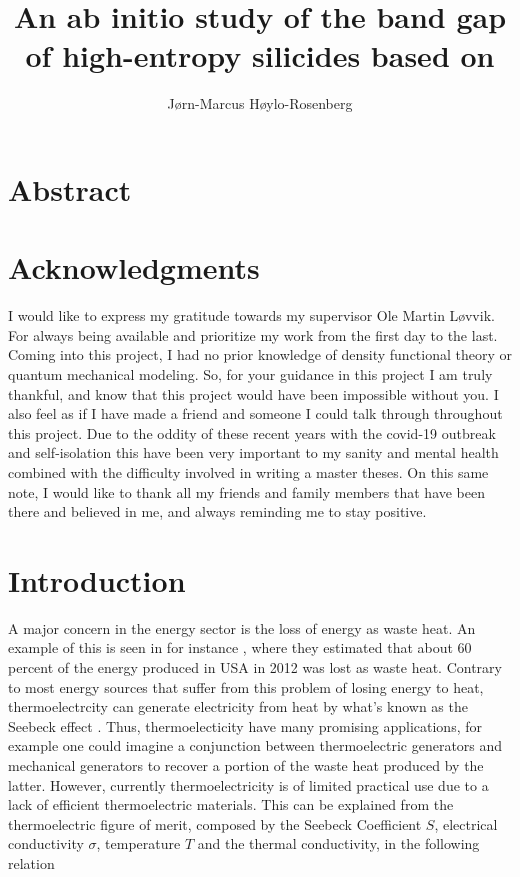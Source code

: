 \documentclass[UKenglish]{ifimaster}  %
\title{An ab initio study of the band gap of high-entropy silicides based on \ch{FeSi2}}        %
\author{Jørn-Marcus Høylo-Rosenberg}                      %
\begin{document}
\duoforside[dept={Department of Chemistry},   %
  program={Materials Science for Energy and Nanotechnology},  %
  long]                                        %

\frontmatter{}  

\chapter*{Abstract}                   %

\tableofcontents{}
\listoffigures{}
\listoftables{}

\chapter*{Acknowledgments}                    %

I would like to express my gratitude towards my supervisor Ole Martin Løvvik. For always being available and prioritize my work from the first day to the last. Coming into this project, I had no prior knowledge of density functional theory or quantum mechanical modeling. So, for your guidance in this project I am truly thankful, and know that this project would have been impossible without you. I also feel as if I have made a friend and someone I could talk through throughout this project. Due to the oddity of these recent years with the covid-19 outbreak and self-isolation this have been very important to my sanity and mental health combined with the difficulty involved in writing a master theses. On this same note, I would like to thank all my friends and family members that have been there and believed in me, and always reminding me to stay positive. 

\mainmatter{}

\chapter{Introduction}                  %

A major concern in the energy sector is the loss of energy as waste heat. An example of this is seen in for instance \cite{thermo}, where they estimated that about 60 percent of the energy produced in USA in 2012 was lost as waste heat. Contrary to most energy sources that suffer from this problem of losing energy to heat, thermoelectrcity can generate electricity from heat by what's known as the Seebeck effect \cite{wikipedia_thermoelectric_2020}. Thus, thermoelecticity have many promising applications, for example one could imagine a conjunction between thermoelectric generators and mechanical generators to recover a portion of the waste heat produced by the latter. However, currently thermoelectricity is of limited practical use due to a lack of efficient thermoelectric materials.  This can be explained from the thermoelectric figure of merit, composed by the Seebeck Coefficient $S$, electrical conductivity $\sigma$, temperature $T$ and the thermal conductivity, in the following relation \cite{bandgap2Dirac} 
\end{document}
